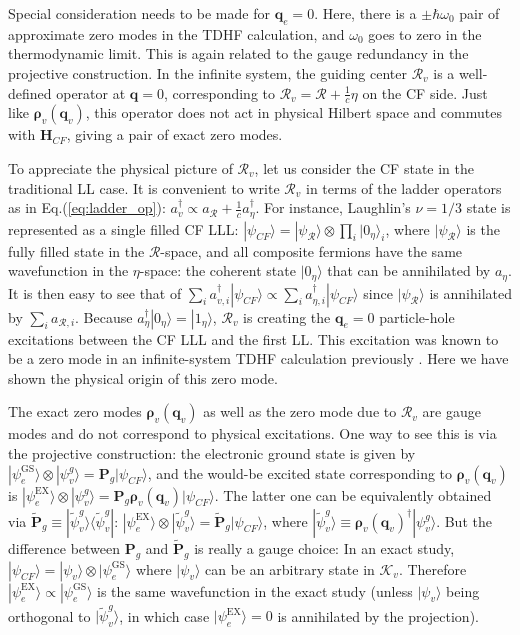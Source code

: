 Special consideration needs to be made for $\mathbf q_e=0$. Here, there is a $\pm\hbar\omega_0$ pair of approximate zero modes in the TDHF calculation, and $\omega_0$ goes to zero in the thermodynamic limit. This is again related to the gauge redundancy in the projective construction. In the infinite system, the guiding center $\mathcal R_v$ is a well-defined operator at $\mathbf q=0$, corresponding to $\mathcal R_v=\mathcal R+\frac{1}{c}\eta$ on the CF side. Just like $\boldsymbol\rho_v(\mathbf q_v)$, this operator does not act in physical Hilbert space and commutes with $\mathbf H_{CF}$, giving a pair of exact zero modes. 

To appreciate the physical picture of $\mathcal R_v$, let us consider the CF state in the traditional LL case. It is convenient to write $\mathcal R_v$ in terms of the ladder operators as in Eq.(\ref{eq:ladder_op}): $a^\dagger_{v}\propto a_{\mathcal R}+\frac{1}{c}a_{\eta}^\dagger$. For instance, Laughlin's $\nu=1/3$ state is represented as a single filled CF LLL: $|\psi_{CF}\rangle=|\psi_{\mathcal R}\rangle\otimes \prod_i |0_{\eta}\rangle_i$, where $|\psi_{\mathcal R}\rangle$ is the fully filled state in the $\mathcal R$-space, and all composite fermions have the same wavefunction in the $\eta$-space: the coherent state $|0_{\eta}\rangle$ that can be annihilated by $a_{\eta}$. It is then easy to see that of $\sum_i a^\dagger_{v,i}|\psi_{CF}\rangle\propto\sum_i a^\dagger_{\eta,i}|\psi_{CF}\rangle $ since $|\psi_{\mathcal R}\rangle$ is annihilated by $\sum_i a_{\mathcal R,i}$. Because $a^\dagger_{\eta}|0_{\eta}\rangle=|1_{\eta}\rangle$, $\mathcal R_v$ is creating the $\mathbf q_e=0$ particle-hole excitations between the CF LLL and the first LL. This excitation was known to be a zero mode in an infinite-system TDHF calculation previously \cite{murthy2001hamiltonian}. Here we have shown the physical origin of this zero mode. 

The exact zero modes $\boldsymbol{\rho}_v(\mathbf q_v)$ as well as the zero mode due to $\mathcal R_v$ are gauge modes and do not correspond to physical excitations. One way to see this is via the projective construction: the electronic ground state is given by $|\psi^{\text{GS}}_e\rangle\otimes |\psi_v^g\rangle=\mathbf P_g|\psi_{CF}\rangle$, and the would-be excited state corresponding to $\boldsymbol{\rho}_v(\mathbf q_v)$ is $|\psi^{\text{EX}}_e\rangle\otimes |\psi_v^g\rangle=\mathbf P_g \boldsymbol{\rho}_v(\mathbf q_v)|\psi_{CF}\rangle$. The latter one can be equivalently obtained via $\mathbf{\tilde{ P}}_g\equiv |\tilde\psi_v^g\rangle\langle\tilde\psi_v^g|$: $|\psi^{\text{EX}}_e\rangle\otimes |\tilde\psi_v^g\rangle=\mathbf{\tilde{ P}}_g |\psi_{CF}\rangle$, where $|\tilde\psi^g_v\rangle\equiv \mathbf\rho_v(\mathbf q_v)^\dagger |\psi^g_v\rangle$. But the difference between $\mathbf P_g$ and $\mathbf{\tilde{ P}}_g$ is really a gauge choice: In an exact study, $|\psi_{CF}\rangle=|\psi_v\rangle\otimes|\psi_e^{\text{GS}}\rangle$ where $|\psi_v\rangle$ can be an arbitrary state in $\mathcal K_v$. Therefore $|\psi^{\text{EX}}_e\rangle\propto |\psi^{\text{GS}}_e\rangle$ is the same wavefunction in the exact study (unless $|\psi_v\rangle$ being orthogonal to $|\tilde\psi^g_v\rangle$, in which case $|\psi^{\text{EX}}_e\rangle=0$ is annihilated by the projection).

